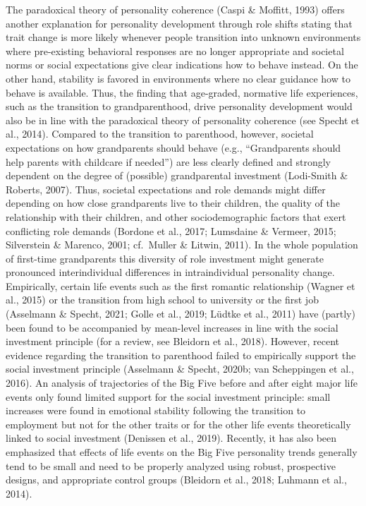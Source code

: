 \documentclass[
  english,
  man, noextraspace]{apa7}
\begin{document}
The paradoxical theory of personality coherence (Caspi \& Moffitt, 1993) offers another explanation for personality development through role shifts stating that trait change is more likely whenever people transition into unknown environments where pre-existing behavioral responses are no longer appropriate and societal norms or social expectations give clear indications how to behave instead. On the other hand, stability is favored in environments where no clear guidance how to behave is available. Thus, the finding that age-graded, normative life experiences, such as the transition to grandparenthood, drive personality development would also be in line with the paradoxical theory of personality coherence (see Specht et al., 2014). Compared to the transition to parenthood, however, societal expectations on how grandparents should behave (e.g., \enquote{Grandparents should help parents with childcare if needed}) are less clearly defined and strongly dependent on the degree of (possible) grandparental investment (Lodi-Smith \& Roberts, 2007). Thus, societal expectations and role demands might differ depending on how close grandparents live to their children, the quality of the relationship with their children, and other sociodemographic factors that exert conflicting role demands (Bordone et al., 2017; Lumsdaine \& Vermeer, 2015; Silverstein \& Marenco, 2001; cf.~Muller \& Litwin, 2011). In the whole population of first-time grandparents this diversity of role investment might generate pronounced interindividual differences in intraindividual personality change.\\
Empirically, certain life events such as the first romantic relationship (Wagner et al., 2015) or the transition from high school to university or the first job (Asselmann \& Specht, 2021; Golle et al., 2019; Lüdtke et al., 2011) have (partly) been found to be accompanied by mean-level increases in line with the social investment principle (for a review, see Bleidorn et al., 2018). However, recent evidence regarding the transition to parenthood failed to empirically support the social investment principle (Asselmann \& Specht, 2020b; van Scheppingen et al., 2016). An analysis of trajectories of the Big Five before and after eight major life events only found limited support for the social investment principle: small increases were found in emotional stability following the transition to employment but not for the other traits or for the other life events theoretically linked to social investment (Denissen et al., 2019). Recently, it has also been emphasized that effects of life events on the Big Five personality trends generally tend to be small and need to be properly analyzed using robust, prospective designs, and appropriate control groups (Bleidorn et al., 2018; Luhmann et al., 2014).\\
\end{document}

